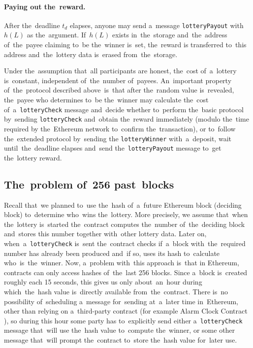 \documentclass[a4paper]{article}
\begin{document}
    \paragraph{Paying out the~reward.}
    After the~deadline $t_d$ elapses, anyone may send a~message \texttt{lotteryPayout} with~$h(L)$ as the~argument.
    If~$h(L)$ exists in~the~storage and~the~address of~the~payee claiming to~be the~winner is~set, the~reward is
    transferred to~this address and~the~lottery data is~erased from~the~storage.

    Under the~assumption that~all participants are honest, the~cost of~a~lottery is~constant, independent of~the~number
    of~payees.
    An~important property of~the~protocol described above~is~that after the~random value is~revealed, the~payee who
    determines to~be the~winner may calculate the~cost of~a~\texttt{lotteryCheck} message and~decide whether to~perform
    the~basic protocol by~sending \texttt{lotteryCheck} and~obtain the~reward immediately (modulo the~time required by
    the~Ethereum network to~confirm the~transaction), or to~follow the~extended protocol by~sending the
    \texttt{lotteryWinner} with~a~deposit, wait until~the~deadline elapses and~send the~\texttt{lotteryPayout} message
    to~get the~lottery reward.
\subsection{The~problem of~256 past~blocks}
    \label{sec:problem256}
    Recall that~we planned to~use the~hash of~a~future Ethereum block (deciding block) to~determine who~wins
    the~lottery. More precisely, we assume that~when the~lottery is~started the~contract computes the~number
    of~the~deciding block and~stores this number together with~other lottery data. Later on,
    when~a~\texttt{lotteryCheck} is~sent the~contract checks if~a~block with~the~required number has already been
    produced and~if so, uses its hash to~calculate who~is~the~winner. Now, a~problem with~this approach is~that in
    Ethereum, contracts can only access hashes of~the~last 256 blocks. Since a~block is~created roughly each 15
    seconds, this gives us only about~an~hour during which~the~hash value is~directly available from~the~contract.
    There is~no possibility of~scheduling a~message for~sending at~a~later time in~Ethereum, other than relying on
    a~third-party contract (for example Alarm Clock Contract \cite{ALARM}), so during this hour some party has
    to~explicitly send either a~\texttt{lotteryCheck} message that~will use the~hash value to~compute the~winner,
    or some other message that~will prompt the~contract to~store the~hash value for~later use.
\end{document}
